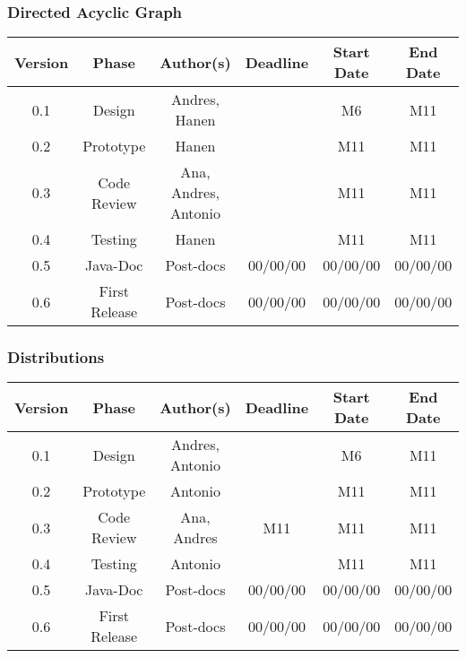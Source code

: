 \subsubsection*{Directed Acyclic Graph}

\begin{table}[H]
\begin{tabular}{cccccc}
\hline
\textbf{Version} & \textbf{Phase} & \textbf{Author(s)} & \textbf{Deadline} & \textbf{Start Date} & \textbf{End Date}\\
\hline
0.1 & Design & Andres, Hanen &  & M6 & M11\\
\hline 
0.2 & Prototype & Hanen & & M11 & M11\\
\hline 
0.3 & Code Review & Ana, Andres, Antonio &  & M11 & M11\\
\hline 
0.4 & Testing & Hanen &  & M11 & M11\\
\hline 
0.5 & Java-Doc  & Post-docs & 00/00/00 & 00/00/00 & 00/00/00\\
\hline 
0.6 & First Release & Post-docs & 00/00/00 & 00/00/00 & 00/00/00\\
\hline
\end{tabular}
\end{table}


\subsubsection*{Distributions}
\begin{table}[H]
\begin{tabular}{cccccc}
\hline
\textbf{Version} & \textbf{Phase} & \textbf{Author(s)} & \textbf{Deadline} & \textbf{Start Date} & \textbf{End Date}\\
\hline
0.1 & Design & Andres, Antonio &  & M6 & M11\\
\hline 
0.2 & Prototype & Antonio &  & M11 & M11\\
\hline 
0.3 & Code Review & Ana, Andres & M11 & M11 & M11\\
\hline 
0.4 & Testing &  Antonio &  & M11  & M11\\
\hline 
0.5 & Java-Doc  & Post-docs & 00/00/00 & 00/00/00 & 00/00/00\\
\hline 
0.6 & First Release & Post-docs & 00/00/00 & 00/00/00 & 00/00/00\\
\hline
\end{tabular}
\end{table}



